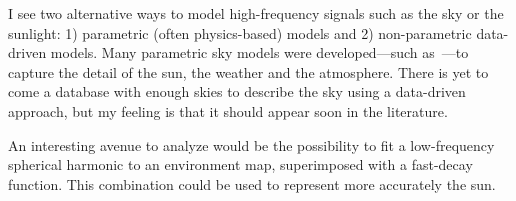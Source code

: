 \documentclass{report}
\begin{document}
I see two alternative ways to model high-frequency signals such as the sky or the sunlight: 1) parametric (often physics-based) models and 2) non-parametric data-driven models. Many parametric sky models were developed---such as~\cite{preetham-siggraph-99,perez-se-93}---to capture the detail of the sun, the weather and the atmosphere. There is yet to come a database with enough skies to describe the sky using a data-driven approach, but my feeling is that it should appear soon in the literature.

An interesting avenue to analyze would be the possibility to fit a low-frequency spherical harmonic to an environment map, superimposed with a fast-decay function. This combination could be used to represent more accurately the sun.


{\small


}
\end{document}
